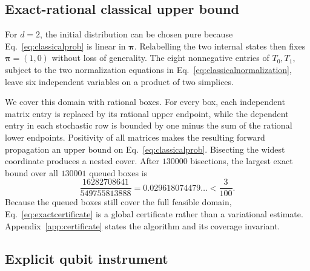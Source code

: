\documentclass[a4paper,twocolumn,11pt,unpublished]{quantumarticle}
\begin{document}
\subsection{Exact-rational classical upper bound}

For $d=2$, the initial distribution can be chosen pure because
Eq.~\eqref{eq:classicalprob} is linear in $\boldsymbol{\pi}$.  Relabelling the
two internal states then fixes $\boldsymbol{\pi}=(1,0)$ without loss of
generality.  The eight nonnegative entries of $T_0,T_1$, subject to the two
normalization equations in Eq.~\eqref{eq:classicalnormalization}, leave six
independent variables on a product of two simplices.

We cover this domain with rational boxes.  For every box, each independent
matrix entry is replaced by its rational upper endpoint, while the dependent
entry in each stochastic row is bounded by one minus the sum of the rational
lower endpoints.  Positivity of all matrices makes the resulting forward
propagation an upper bound on Eq.~\eqref{eq:classicalprob}.  Bisecting the
widest coordinate produces a nested cover.  After $130000$ bisections, the
largest exact bound over all $130001$ queued boxes is
\begin{equation}
  \frac{16282708641}{549755813888}
  =0.029618074479\ldots < \frac{3}{100}.
  \label{eq:exactcertificate}
\end{equation}
Because the queued boxes still cover the full feasible domain,
Eq.~\eqref{eq:exactcertificate} is a global certificate rather than a
variational estimate.  Appendix~\ref{app:certificate} states the algorithm
and its coverage invariant.

\subsection{Explicit qubit instrument}
\end{document}
